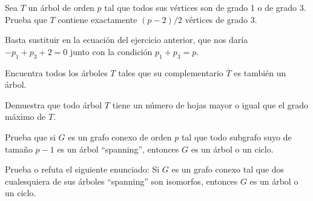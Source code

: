 \documentclass[twoside]{article}
\begin{document}
\newpage

\begin{ejercicio}{1.3}

Sea $T$ un árbol de orden $p$ tal que todos sus vértices son de grado 1 o de grado 3. Prueba
que $T$ contiene exactamente $(p - 2)/2$ vértices de grado 3.
\end{ejercicio}
\begin{solucion}
Basta sustituir en la ecuación del ejercicio anterior, que nos daría $-p_1+p_3+2=0$ junto con la condición $p_1+p_3=p$. 
\end{solucion}

\newpage

\begin{ejercicio}{1.4}

Encuentra todos los árboles $T$ tales que su complementario $\overline{T}$ es también un árbol.
\end{ejercicio}
\begin{solucion}

\end{solucion}

\newpage

\begin{ejercicio}{1.5}

Demuestra que todo árbol $T$ tiene un número de hojas mayor o igual que el grado máximo
de $T$.
\end{ejercicio}
\begin{solucion}

\end{solucion}

\newpage

\begin{ejercicio}{1.6}
Prueba que si $G$ es un grafo conexo de orden $p$ tal que todo subgrafo suyo de tamaño
$p -1$ es un árbol ``spanning'', entonces $G$ es un árbol o un ciclo.
\end{ejercicio}
\begin{solucion}
\end{solucion}

\newpage

\begin{ejercicio}{1.7}
Prueba o refuta el siguiente enunciado: Si $G$ es un grafo conexo tal que dos cualesquiera
de sus árboles ``spanning'' son isomorfos, entonces $G$ es un árbol o un ciclo.
\end{ejercicio}
\begin{solucion}

\end{solucion}
\end{document}
